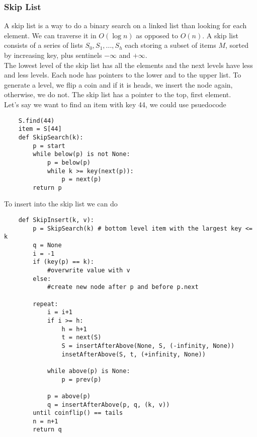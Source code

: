 \documentclass[]{article}
\begin{document}
\subsubsection{Skip List}\bigbreak

A skip list is a way to do a binary search on a linked list than looking for each element. We can traverse it in $O(\log n)$ as opposed to $O(n)$. A skip list consists of a series of lists ${S_0, S_1, ..., S_h}$ each storing a subset of items $M$, sorted by increasing key, plus sentinels $-\infty$ and $+\infty$.\\


The lowest level of the skip list has all the elements and the next levels have less and less levels. Each node has pointers to the lower and to the upper list. To generate a level, we flip a coin and if it is heads, we insert the node again, otherwise, we do not. The skip list has a pointer to the top, first element. \\

Let's say we want to find an item with key 44, we could use psuedocode

\begin{lstlisting}
	S.find(44)
	item = S[44]
	def SkipSearch(k):
		p = start
		while below(p) is not None:
			p = below(p)
			while k >= key(next(p)):
				p = next(p)
		return p
\end{lstlisting}\bigbreak


To insert into the skip list we can do

\begin{lstlisting}
	def SkipInsert(k, v):
		p = SkipSearch(k) # bottom level item with the largest key <= k
		q = None
		i = -1
		if (key(p) == k):
			#overwrite value with v
		else:
			#create new node after p and before p.next
			
		repeat:
			i = i+1
			if i >= h:
				h = h+1
				t = next(S)
				S = insertAfterAbove(None, S, (-infinity, None))
				insetAfterAbove(S, t, (+infinity, None))
				
			while above(p) is None:
				p = prev(p)
				
			p = above(p)
			q = insertAfterAbove(p, q, (k, v))
		until coinflip() == tails
		n = n+1
		return q
\end{lstlisting}\bigbreak
\end{document}
